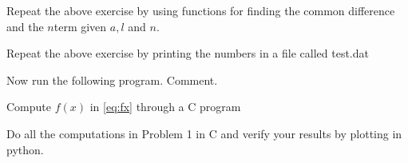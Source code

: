 \documentclass[journal,12pt,twocolumn]{IEEEtran}
\begin{document}
\solution

\begin{problem}
Repeat the above exercise by using functions for finding the common difference
and the $n$term given $a,l$ and $n$.
\end{problem}
\solution

\begin{problem}
Repeat the above exercise by printing the numbers in a file called test.dat
\end{problem}
\solution

\begin{problem}
Now run the following program.  Comment.
\end{problem}

\begin{problem}
Compute $f(x)$ in \eqref{eq:fx} through a C program
\end{problem}
\solution

\begin{problem}
Do all the computations in Problem 1 in C and verify your results by plotting in python.
\end{problem}
\end{document}
